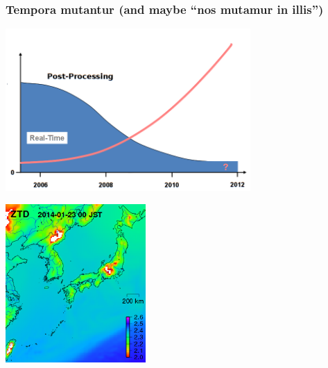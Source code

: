 \documentclass[10pt]{beamer}
\begin{document}

\begin{frame}
\frametitle{Tempora mutantur (and maybe ``nos mutamur in illis'')}

\includegraphics[width=0.7\textwidth,angle=0]{pp_vs_rt.png}

\vspace*{-2cm}
\hspace*{6cm}
\includegraphics[width=0.4\textwidth,angle=0]{ea_ztd_21h.png}


\end{frame}


\end{document}
